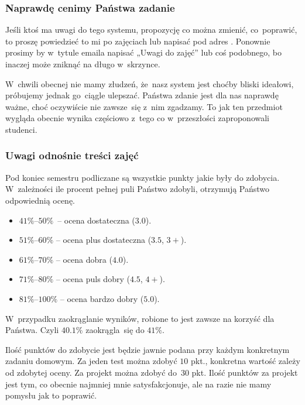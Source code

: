 \documentclass[10pt,t]{beamer}
\begin{document}
\begin{frame}
  \frametitle{Naprawdę cenimy Państwa zadanie}


  Jeśli ktoś ma uwagi do tego systemu, propozycję co można zmienić,
  co~poprawić, to proszę powiedzieć to mi po zajęciach lub napisać pod
  adres \email. Ponownie prosimy by w~tytule emaila napisać „Uwagi do zajęć”
  lub coś podobnego, bo inaczej może zniknąć na długo w~skrzynce.

  W~chwili obecnej nie mamy złudzeń, że~nasz system jest choćby bliski
  ideałowi, próbujemy jednak go~ciągle ulepszać. Państwa zdanie jest dla
  nas naprawdę ważne, choć oczywiście nie zawsze~się z~nim zgadzamy.
  To jak ten przedmiot wygląda obecnie wynika częściowo z~tego co
  w~przeszłości zaproponowali studenci.

\end{frame}





\begin{frame}
  \frametitle{Uwagi odnośnie treści zajęć}


  Pod koniec semestru podliczane są wszystkie punkty jakie były do
  zdobycia. W~zależności ile procent pełnej puli Państwo zdobyli, otrzymują
  Państwo odpowiednią ocenę.

  \vspace{-0.3em}



  \begin{itemize}

  \item $41\%\text{--}50\%$~-- ocena dostateczna ($3.0$).

  \item $51\%\text{--}60\%$ -- ocena plus dostateczna ($3.5$, $3+$).

  \item $61\%\text{--}70\%$ -- ocena dobra ($4.0$).

  \item $71\%\text{--}80\%$ -- ocena puls dobry ($4.5$, $4+$).

  \item $81\%\text{--}100\%$ -- ocena bardzo dobry ($5.0$).

  \end{itemize}

  \vspace{-0.3em}



  W~przypadku zaokrąglanie wyników, robione to jest zawsze na korzyść dla
  Państwa. Czyli $40.1\%$ zaokrągla~się do $41\%$.

  Ilość punktów do zdobycie jest będzie jawnie podana przy każdym
  konkretnym zadaniu domowym. Za jeden test można zdobyć $10$ pkt.,
  konkretna wartość zależy od zdobytej oceny. Za projekt można zdobyć
  do~$30$ pkt. Ilość punktów za projekt jest tym, co obecnie najmniej mnie
  satysfakcjonuje, ale na razie nie mamy pomysłu jak to poprawić.

\end{frame}
\end{document}
